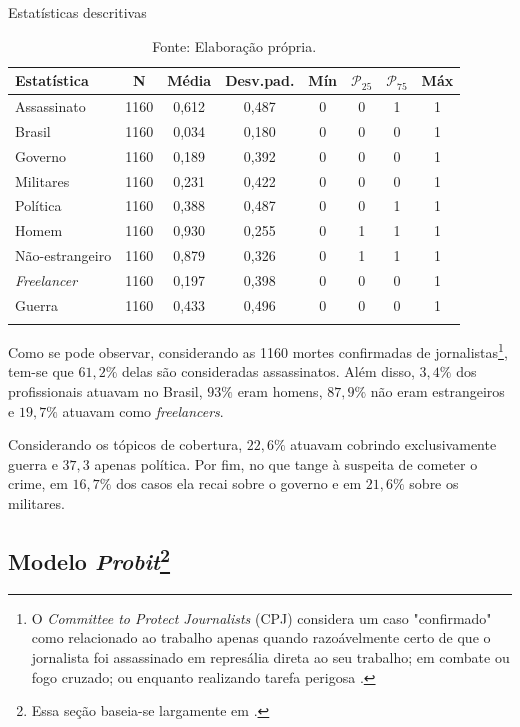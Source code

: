 \documentclass[12pt,
               openright,
               oneside,
               a4paper,
							 section=TITLE,     %
               subsection=Title,  %
               english,brazil]{article}
\begin{document}
\begin{table}[H] \centering 
  \caption{Estatísticas descritivas} 
  \label{tab:descritivas} 
\begin{tabular}{lccccccc} 
Estatística & \multicolumn{1}{c}{N} & \multicolumn{1}{c}{Média} & \multicolumn{1}{c}{Desv.pad.} & \multicolumn{1}{c}{Mín} & \multicolumn{1}{c}{$\mathcal{P}_{25}$} & \multicolumn{1}{c}{$\mathcal{P}_{75}$} & \multicolumn{1}{c}{Máx} \\ 
\midrule
Assassinato & 1160 & 0,612 & 0,487 & 0 & 0 & 1 & 1 \\ 
Brasil & 1160 & 0,034 & 0,180 & 0 & 0 & 0 & 1 \\ 
Governo & 1160 & 0,189 & 0,392 & 0 & 0 & 0 & 1 \\ 
Militares & 1160 & 0,231 & 0,422 & 0 & 0 & 0 & 1 \\ 
Política & 1160 & 0,388 & 0,487 & 0 & 0 & 1 & 1 \\ 
Homem & 1160 & 0,930 & 0,255 & 0 & 1 & 1 & 1 \\ 
Não-estrangeiro & 1160 & 0,879 & 0,326 & 0 & 1 & 1 & 1 \\ 
\textit{Freelancer} & 1160 & 0,197 & 0,398 & 0 & 0 & 0 & 1 \\ 
Guerra & 1160 & 0,433 & 0,496 & 0 & 0 & 0 & 1 \\ 
\bottomrule \\ 
\end{tabular} 
\caption*{Fonte: Elaboração própria.}
\end{table} 

Como se pode observar, considerando as 1160 mortes confirmadas de jornalistas\footnote[1]{O \textit{Committee to Protect Journalists} (CPJ) considera um caso  "confirmado" como relacionado ao trabalho apenas quando razoávelmente certo de que o jornalista foi assassinado em represália direta ao seu trabalho; em combate ou fogo cruzado; ou enquanto realizando tarefa perigosa \cite{CPJ2020}.}, tem-se que $61,2\%$ delas são consideradas assassinatos. Além disso, $3,4\%$ dos profissionais atuavam no Brasil, $93\%$ eram homens, $87,9\%$ não eram estrangeiros e $19,7\%$ atuavam como \textit{freelancers}.

Considerando os tópicos de cobertura, $22,6\%$ atuavam cobrindo exclusivamente guerra e $37,3$ apenas política. Por fim, no que tange à suspeita de cometer o crime, em $16,7\%$ dos casos ela recai sobre o governo e em $21,6\%$ sobre os militares.

\subsection{Modelo \textit{Probit}\footnote[2]{Essa seção baseia-se largamente em \cite{Greene2018}.}}
\end{document}

